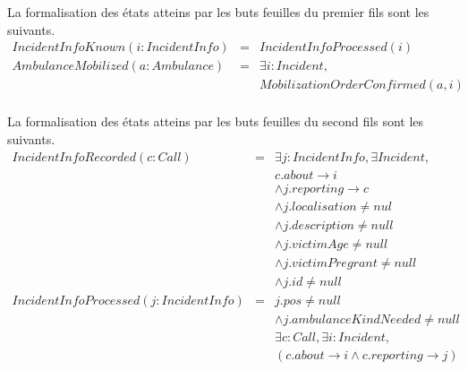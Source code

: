 	La formalisation des états atteins par les buts feuilles du premier fils sont
	les suivants.
	\begin{equation*}
		\begin{array}{rcl}
			IncidentInfoKnown(i:IncidentInfo)  
			& = & IncidentInfoProcessed(i) \\
			
			AmbulanceMobilized(a: Ambulance) 
			& = & \exists i:Incident, \\
			&   & MobilizationOrderConfirmed(a, i) \\
		\end{array}
	\end{equation*}
	
	La formalisation des états atteins par les buts feuilles du second fils sont
	les suivants.
	\begin{equation*}
		\begin{array}{rcl}
			IncidentInfoRecorded(c:Call)  
			& = & \exists j:IncidentInfo, \exists Incident, \\
			&   & c.about \rightarrow i \\
			&   & \wedge j.reporting \rightarrow c \\
			&   & \wedge j.localisation \neq nul \\
			&   & \wedge j.description \neq null \\
			&   & \wedge j.victimAge \neq null \\
			&   & \wedge j.victimPregrant \neq null \\
			&   & \wedge j.id \neq null \\
			
			IncidentInfoProcessed(j:IncidentInfo)  
			& = & j.pos \neq null \\
			&   & \wedge j.ambulanceKindNeeded \neq null \\
			&   & \exists c:Call, \exists i:Incident, \\
			&   & (c.about \rightarrow i \wedge c.reporting \rightarrow j) \\
		\end{array}
	\end{equation*}
	
